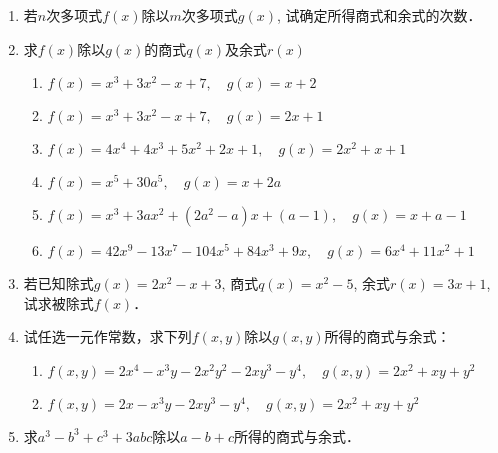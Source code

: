 \begin{ex}
\begin{enumerate}
    \item 若$n$次多项式$f(x)$除以$m$次多项式$g(x)$, 试确定所得商式和余式的次数．
    \item 求$f(x)$除以$g(x)$的商式$q(x)$及余式$r(x)$
\begin{enumerate}
    \item $f(x)=x^3+3x^2-x+7,\quad g(x)=x+2$
    \item $f(x)=x^3+3x^2-x+7,\quad g(x)=2x+1$
    \item $f(x)=4x^4+4x^3+5x^2+2x+1,\quad 
g (x) =2x^2+x+1$
    \item $f (x) =x^5+30a^5,\quad g (x) =x+2a$
    \item $f(x)=x^3+3ax^2+(2a^2 -a)x+(a-1),\quad g (x) =x+a-1$
    \item $f(x)=42x^9-13x^7-104x^5+84x^3+9x,\quad 
g (x) =6x^4+11x^2+1$
\end{enumerate}
\item 
若已知除式$g(x)=2x^2-x+3$, 商式$q(x)=x^2-5$, 余式$r(x)=3x+1$, 试求被除式$f(x)$．

\item 试任选一元作常数，求下列$f(x,y)$除以$g(x,y)$所得的商式与余式：
\begin{enumerate}
    \item $f (x,y) =2x^4-x^3y-2x^2y^2-2xy^3-y^4,\quad 
g (x,y) =2x^2+xy+y^2$
    \item $f(x,y)=2x-x^3y-2xy^3-y^4,\quad 
g (x,y) =2x^2+xy+y^2$
\end{enumerate}

\item 求$a^3-b^3+c^3+3abc$除以$a-b+c$所得的商式与余式．
\end{enumerate}
\end{ex}


